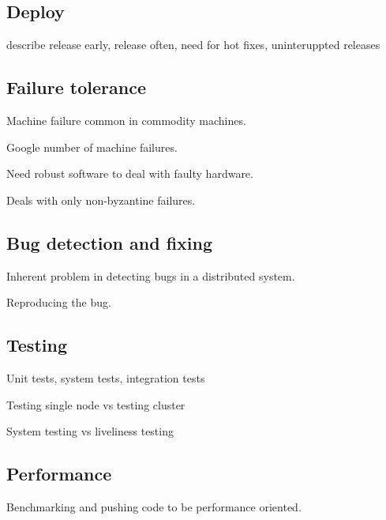 \subsection{Deploy}

{describe release early, release often, need for hot fixes, uninteruppted
releases}

\subsection{Failure tolerance}

Machine failure common in commodity machines.

Google number of machine failures.

Need robust software to deal with faulty hardware.

Deals with only non-byzantine failures.

\subsection{Bug detection and fixing}

Inherent problem in detecting bugs in a distributed system.

Reproducing the bug.

\subsection{Testing}

Unit tests, system tests, integration tests

Testing single node vs testing cluster

System testing vs liveliness testing

\subsection{Performance}

Benchmarking and pushing code to be performance oriented.
